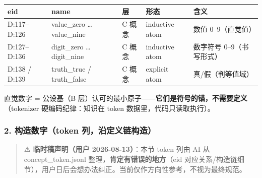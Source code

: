 \documentclass[
]{article}
\newcounter{none} %
\begin{document}
{\def\LTcaptype{none} %
\begin{longtable}[]{@{}
 >{\raggedright\arraybackslash}p{}
 >{\raggedright\arraybackslash}p{}
 >{\raggedright\arraybackslash}p{}
 >{\raggedright\arraybackslash}p{}
 >{\raggedright\arraybackslash}p{}@{}}
\toprule\noalign{}
\begin{minipage}[b]{\linewidth}\raggedright
eid
\end{minipage} & \begin{minipage}[b]{\linewidth}\raggedright
name
\end{minipage} & \begin{minipage}[b]{\linewidth}\raggedright
层
\end{minipage} & \begin{minipage}[b]{\linewidth}\raggedright
形态
\end{minipage} & \begin{minipage}[b]{\linewidth}\raggedright
含义
\end{minipage} \\
\midrule\noalign{}
\endhead
\bottomrule\noalign{}
\endlastfoot
D:117--D:126 & value\_zero \ldots{} value\_nine & C 概念 & inductive
atom & 数值 0--9（直觉值） \\
D:127--D:136 & digit\_zero \ldots{} digit\_nine & C 概念 & inductive
atom & 数字符号 0--9（书写形式） \\
D:138 / D:139 & truth\_true / truth\_false & C 概念 & explicit atom &
真/假（判等值域） \\
\end{longtable}
}

直觉数字 = 公设基（B
层）认可的最小原子------\textbf{它们是符号的锚，不需要定义}（tokenizer
硬编码纪律：知识在 token 数据里，代码只读取执行）。

\subsubsection{2. 构造数字（token
列，沿定义链构造）}\label{ux6784ux9020ux6570ux5b57token-ux5217ux6cbfux5b9aux4e49ux94feux6784ux9020}

\begin{quote}
⚠️ \textbf{临时稿声明（用户 2026-08-13）}：本节 token 列由 AI 从
concept\_token.jsonl 整理，\textbf{肯定有错误的地方}（eid
对应关系/构造链细节），用户日后会想办法纠正。当前仅作方向性参考，不视为最终规范。
\end{quote}
\end{document}
